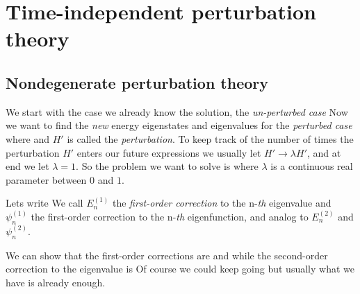 \documentclass[oneside, 12pt, notitlepage]{book}
\begin{document}
\pagestyle{mynotespage}

\chapter{Time-independent perturbation theory}

\section{Nondegenerate perturbation theory}

We start with the case we already know the solution, the \emph{un-perturbed case}
Now we want to find the \emph{new} energy eigenstates and eigenvalues for the \emph{perturbed case}
where
and \(H'\) is called the \emph{perturbation}. To keep track of the number of times the perturbation \(H'\) enters our future expressions we usually let \(H' \rightarrow \lambda H'\), and at end we let \(\lambda = 1\). So the problem we want to solve is
where \(\lambda\) is a continuous real parameter between \(0\) and \(1\).\par



Lets write
We call \(E_n^{(1)}\) the \emph{first-order correction} to the n-\emph{th} eigenvalue and \(\psi_n^{(1)}\) the first-order correction to the n-\emph{th} eigenfunction, and analog to \(E_n^{(2)}\) and \(\psi_n^{(2)}\).\par

We can show that the first-order corrections are
and
while the second-order correction to the eigenvalue is
Of course we could keep going but usually what we have is already enough.\par
\end{document}
